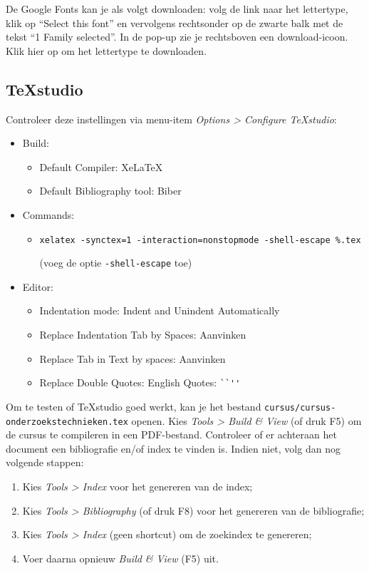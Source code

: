 De Google Fonts kan je als volgt downloaden: volg de link naar het lettertype, klik op ``Select this font'' en vervolgens rechtsonder op de zwarte balk met de tekst ``1 Family selected''. In de pop-up zie je rechtsboven een download-icoon. Klik hier op om het lettertype te downloaden.

\subsection{TeXstudio}

Controleer deze instellingen via menu-item \emph{Options > Configure TeXstudio}:

\begin{itemize}
  \item Build:
  \begin{itemize}
    \item Default Compiler: XeLaTeX
    \item Default Bibliography tool: Biber
  \end{itemize}
  \item Commands:
  \begin{itemize}
    \item \texttt{xelatex -synctex=1 -interaction=nonstopmode  -shell-escape \%.tex}
    
    (voeg de optie \texttt{-shell-escape} toe)
  \end{itemize}
  \item Editor:
  \begin{itemize}
    \item Indentation mode: Indent and Unindent Automatically
    \item Replace Indentation Tab by Spaces: Aanvinken
    \item Replace Tab in Text by spaces: Aanvinken
    \item Replace Double Quotes: English Quotes: \verb|``''|
  \end{itemize}

\end{itemize}

Om te testen of TeXstudio goed werkt, kan je het bestand \texttt{cursus/cursus-onderzoekstech\-nie\-ken.tex} openen. Kies \emph{Tools > Build \& View} (of druk F5) om de cursus te compileren in een PDF-bestand. Controleer of er achteraan het document een bibliografie en/of index te vinden is. Indien niet, volg dan nog volgende stappen:

\begin{enumerate}
  \item Kies \emph{Tools > Index} voor het genereren van de index;
  \item Kies \emph{Tools > Bibliography} (of druk F8) voor het genereren van de bibliografie;
  \item Kies \emph{Tools > Index} (geen shortcut) om de zoekindex te genereren;
  \item Voer daarna opnieuw \emph{Build \& View} (F5) uit.
\end{enumerate}

